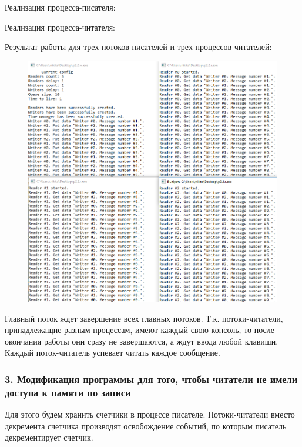 \documentclass[14pt,a4paper,report]{report}
\begin{document}
Реализация процесса-писателя:



Реализация процесса-читателя:



\clearpage

Результат работы для трех потоков писателей и трех процессов читателей:

\begin{figure}[h!]
	\centering
	\includegraphics[scale = 0.74]{images/p2_2.png}
	
	\caption{}
	\label{image:14}
\end{figure}

Главный поток ждет завершение всех главных потоков. Т.к. потоки-читатели, принадлежащие разным процессам, имеют каждый свою консоль, то после окончания работы они сразу не завершаются, а ждут ввода любой клавиши. Каждый поток-читатель успевает читать каждое сообщение.

\subsubsection{3. Модификация программы для того, чтобы читатели не имели доступа к памяти по записи}

Для этого будем хранить счетчики в процессе писателе. Потоки-читатели вместо декремента счетчика производят освобождение событий, по которым писатель декрементирует счетчик.
 
\end{document}
